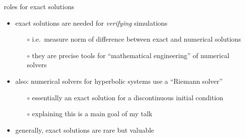 \documentclass[10pt,hyperref,dvipsnames]{beamer}
\begin{document}
\begin{frame}{roles for exact solutions}

\begin{itemize}
\item exact solutions are needed for \emph{verifying} simulations
    \begin{itemize}
    \item[$\circ$] i.e.~measure norm of difference between exact and numerical solutions
    \item[$\circ$] they are precise tools for ``mathematical engineering'' of numerical solvers
    \end{itemize}
\item also: numerical solvers for hyperbolic systems use a ``Riemann solver'' 
    \begin{itemize}
    \item[$\circ$] essentially an exact solution for a discontinuous initial condition
    \item[$\circ$] explaining this is a main goal of my talk
    \end{itemize}
\item generally, exact solutions are rare but valuable
\end{itemize}
\end{frame}
\end{document}
